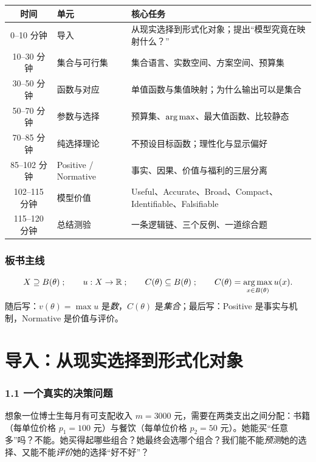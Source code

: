 \begin{center}
\begin{tabular}{clp{6.5cm}}
\toprule
时间 & 单元 & 核心任务 \\
\midrule
0–10 分钟    & 导入 & 从现实选择到形式化对象；提出“模型究竟在映射什么？” \\
10–30 分钟   & 集合与可行集 & 集合语言、实数空间、方案空间、预算集 \\
30–50 分钟   & 函数与对应 & 单值函数与集值映射；为什么输出可以是集合 \\
50–70 分钟   & 参数与选择 & 预算集、$\operatorname*{arg\,max}$、最大值函数、比较静态 \\
70–85 分钟   & 纯选择理论 & 不预设目标函数；理性化与显示偏好 \\
85–102 分钟  & Positive / Normative & 事实、因果、价值与福利的三层分离 \\
102–115 分钟 & 模型价值 & Useful、Accurate、Broad、Compact、Identifiable、Falsifiable \\
115–120 分钟 & 总结测验 & 一条逻辑链、三个反例、一道综合题 \\
\bottomrule
\end{tabular}
\end{center}



\subsubsection*{板书主线}


\[
X\supseteq B(\theta)\;;\qquad
u:X\to\mathbb{R}\;;\qquad
C(\theta)\subseteq B(\theta)\;;\qquad
C(\theta)=\operatorname*{arg\,max}_{x\in B(\theta)} u(x).
\]
随后写：$v(\theta)=\max u$ 是\emph{数}，$C(\theta)$ 是\emph{集合}；最后写：Positive 是事实与机制，Normative 是价值与评价。





\section{导入：从现实选择到形式化对象}



\subsubsection*{1.1 一个真实的决策问题}



想象一位博士生每月有可支配收入 $m=3000$ 元，需要在两类支出之间分配：书籍（每单位价格 $p_1=100$ 元）与餐饮（每单位价格 $p_2=50$ 元）。她能买“任意多”吗？不能。她买得起哪些组合？她最终会选哪个组合？我们能不能\emph{预测}她的选择、又能不能\emph{评价}她的选择“好不好”？

